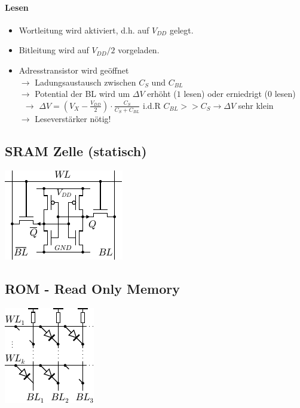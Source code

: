 \documentclass[6pt,a4paper]{scrartcl}
\newcommand{\ra}[0]{\ensuremath{\rightarrow}} 									%
\begin{document}
\begin{multicols}{3}
	\paragraph{Lesen}
	\begin{itemize}\itemsep0pt
		\item Wortleitung wird aktiviert, d.h. auf $V_{DD}$ gelegt. 
		\item Bitleitung wird auf $V_{DD} / 2$ vorgeladen.
		\item Adresstransistor wird geöffnet \\
		$\ra$ Ladungsaustausch zwischen $C_S$ und $C_{BL}$ \\
		$\ra$ Potential der BL wird um $\Delta V$ erhöht ($1$ lesen) oder erniedrigt ($0$ lesen) \\\
		$\ra$ $\Delta V = \left(V_X - \frac{V_{DD}}{2}\right) \cdot \frac{C_S}{C_S + C_{BL}}$ \quad i.d.R $C_{BL} >> C_S \ra \Delta V$ sehr klein \\
		$\ra $ Leseverstärker nötig!
	\end{itemize}

\begin{multicols}{2}	
	\subsection{SRAM Zelle (statisch)}
	\includegraphics{img/ds/SRAM.pdf}


	\subsection{ROM - Read Only Memory}
	\includegraphics{img/ds/ROM.pdf}
\end{multicols}


\end{multicols}
\end{document}
